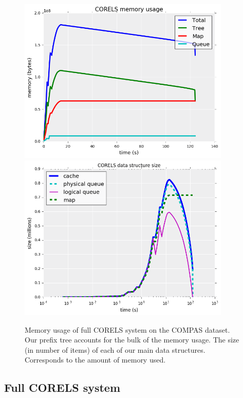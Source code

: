 \begin{figure}
\begin{center}
\begin{minipage}{\textwidth}
\includegraphics[width=0.9\textwidth]{figs/corels_mem.png}
\includegraphics[width=0.9\textwidth]{figs/corels_size.png}
\caption{Memory usage of full CORELS system on the COMPAS dataset. 
Our prefix tree accounts for the bulk of the memory usage.
The size (in number of items) of each of our main data structures.
Corresponds to the amount of memory used.}
\end{minipage}
\end{center}
\label{fig:corels-mem}
\end{figure}

\subsection{Full CORELS system}

